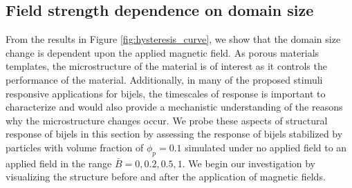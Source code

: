 \subsection{Field strength dependence on domain
size}\label{section:field-strength-dependence-on-domain-size}

From the results in Figure \ref{fig:hysteresis_curve}, we show that the domain size change is dependent upon the applied magnetic field. As porous materials templates,
the microstructure of the material is of interest as it controls the performance of the material. Additionally, in many of the proposed stimuli responsive applications
for bijels, the timescales of response is important to characterize and would also provide a mechanistic understanding of the reasons why the microstructure changes 
occur. We probe these aspects of structural response of bijels in this section by assessing the response of bijels stabilized by particles with volume fraction of 
$\phi_p = 0.1$ simulated under no applied field to an applied field in the range $\bar{B} = 0, 0.2, 0.5, 1$. We begin our investigation by visualizing the structure before 
and after the application of magnetic fields.


